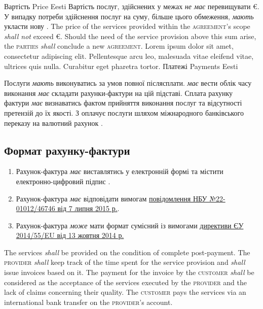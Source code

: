 \begin{Form}
\begin{paracol}{3}
      \clause
        {Вартість}
        {Price}
        {Eesti}
        {Вартість послуг, здійснених у межах  \textit{не має} перевищувати  €. У випадку потреби здійснення послуг на суму, більше цього обмеження,  \textit{мають} укласти нову .}
        {The price of the services provided within the \textsc{agreement}'s scope \textit{shall not} exceed  €. Should the need of the service provision above this sum arise, the \textsc{parties} \textit{shall} conclude a new \textsc{agreement}.}
        {Lorem ipsum dolor sit amet, consectetur adipiscing elit. Pellentesque arcu leo, malesuada vitae eleifend vitae, ultrices quis nulla. Curabitur eget pharetra tortor.}
      \clause %
        {Платежі}
        {Payments}
        {Eesti}
        {\label{sec:payment}Послуги \textit{мають} виконуватись за умов повної післясплати.  \textit{має} вести облік часу виконання \textit{має} складати рахунки-фактури на цій підставі. Сплата  рахунку фактури \textit{має} визнаватись фактом прийняття виконання  послуг  та відсутності претензій до їх якості. З оплачує послуги шляхом міжнародного банківського переказу на валютний рахунок .

        \subsection{Формат рахунку-фактури}
        \begin{enumerate}
          \item Рахунок-фактура \textit{має} виставлятись у електронній формі та містити електронно-цифровий підпис .
          \item Рахунок-фактура \textit{має} відповідати вимогам \href{http://bank.gov.ua/doccatalog/document?id=19208488}{повідомлення НБУ №22-01012/46746 від 7 липня 2015 р.}.
          \item Рахунок-фактура \textit{може} мати формат сумісний із вимогами \href{http://eur-lex.europa.eu/legal-content/EN/TXT/?uri=CELEX:32014L0055}{директиви ЄУ 2014/55/EU від 13 жовтня 2014 р.}
        \end{enumerate}
        }
        {The services \textit{shall} be provided on the condition of complete post-payment. The \textsc{provider} \textit{shall} keep track of the time spent for the service provision and \textit{shall} issue invoices based on it. The payment for the invoice by the \textsc{customer} \textit{shall} be considered as the acceptance of the services executed by the \textsc{provider} and the lack of claims concerning their quality. The \textsc{customer} pays the services via an international bank transfer on the \textsc{provider}'s account.

}
\end{paracol}
\end{Form}
